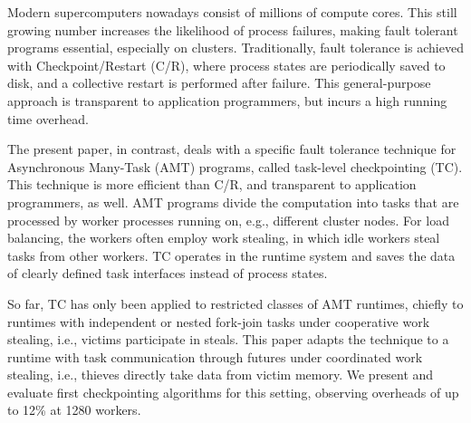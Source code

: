 Modern supercomputers nowadays consist of millions of compute cores.
This still growing number increases the likelihood of process
failures, making fault tolerant programs essential, especially on clusters.
Traditionally, fault tolerance is achieved with Checkpoint/Restart (C/R),
where process states are periodically saved to disk, and a collective
restart is performed after failure. This general-purpose approach is
transparent to application programmers, but incurs a high running time overhead.

The present paper, in contrast, deals with a specific fault tolerance technique
for Asynchronous Many-Task (AMT) programs, called task-level
checkpointing (TC). This technique is more efficient than C/R, and
transparent to application programmers, as well. AMT programs divide
the computation into tasks that are processed by worker processes running on,
e.g., different cluster nodes. For load balancing, the workers
often employ work stealing, in which idle workers steal tasks from other
workers. TC operates in the runtime system and saves the data of clearly
defined task interfaces instead of process states.

So far, TC has only been applied to restricted classes of AMT runtimes,
chiefly to runtimes with independent or nested fork-join tasks under
cooperative work stealing, i.e., victims participate in steals. This paper
adapts the technique to a runtime with task communication through
futures under coordinated work stealing, i.e., thieves directly take data
from victim memory. We present and evaluate first checkpointing algorithms
for this setting, observing overheads of up to 12\% at 1280 workers.

